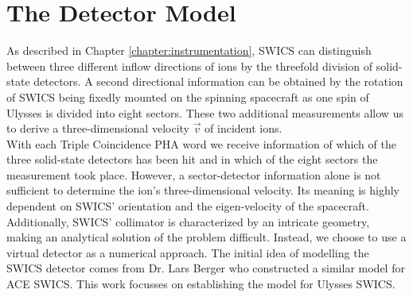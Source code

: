 \section{The Detector Model}
As described in Chapter \ref{chapter:instrumentation}, SWICS can distinguish between three different inflow directions of ions by the threefold division of solid-state detectors. A second directional information can be obtained by the rotation of SWICS being fixedly mounted on the spinning spacecraft as one spin of Ulysses is divided into eight sectors. These two additional measurements allow us to derive a three-dimensional velocity $\vec{v}$ of incident ions.\\
With each Triple Coincidence PHA word we receive information of which of the three solid-state detectors has been hit and in which of the eight sectors the measurement took place. However, a sector-detector information alone is not sufficient to determine the ion's three-dimensional velocity. Its meaning is highly dependent on SWICS' orientation and the eigen-velocity of the spacecraft. Additionally, SWICS' collimator is characterized by an intricate geometry, making an analytical solution of the problem difficult. Instead, we choose to use a virtual detector as a numerical approach. The initial idea of modelling the SWICS detector comes from Dr. Lars Berger who constructed a similar model for ACE SWICS. This work focusses on establishing the model for Ulysses SWICS.



